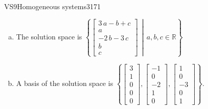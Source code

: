 \begin{exercise}{VS9}{Homogeneous systems}{3171}
\begin{exerciseAnswer}
\begin{enumerate}[(a)]
\item The solution space is \( \left\{ \left[\begin{array}{c}
3 \, a - b + c \\
a \\
-2 \, b - 3 \, c \\
b \\
c
\end{array}\right] \,\middle|\, a,b,c \in\mathbb R \right\} \) 
\item A basis of the solution space is \(\left\{ \left[\begin{array}{c}
3 \\
1 \\
0 \\
0 \\
0
\end{array}\right] , \left[\begin{array}{c}
-1 \\
0 \\
-2 \\
1 \\
0
\end{array}\right] , \left[\begin{array}{c}
1 \\
0 \\
-3 \\
0 \\
1
\end{array}\right] \right\}\).
\end{enumerate}

     \end{exerciseAnswer}
 \end{exercise}



